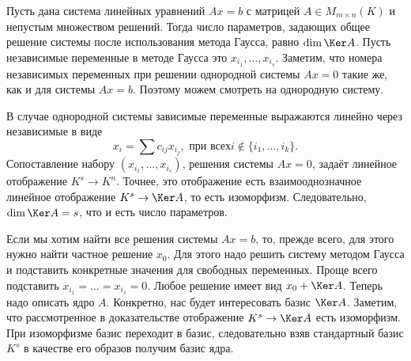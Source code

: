 \thrm Пусть дана система линейных уравнений $Ax=b$ с матрицей $A\in M_{m\times n}(K)$ и непустым множеством решений. Тогда число параметров, задающих общее решение системы после использования метода Гаусса, равно $\dim \Ker A$.
\ethrm
\proof Пусть независимые переменные в методе Гаусса это $x_{i_1}, \dots,x_{i_s}$.
Заметим, что номера независимых переменных при решении однородной системы $Ax=0$ такие же, как и для системы $Ax=b$. Поэтому можем смотреть на однородную систему.

В случае однородной системы зависимые переменные  выражаются линейно через независимые в виде
$$x_i= \sum c_{ij} x_{i_j}, \text{ при всех} i \notin \{i_1,\dots, i_k\}.$$
Сопоставление набору $(x_{i_1},\dots, x_{i_s})$, решения системы $Ax=0$, задаёт линейное отображение $K^s \to K^n$. Точнее, это отображение есть взаимооднозначное линейное отображение $K^s \to \Ker A$, то есть изоморфизм. Следовательно, $\dim \Ker A = s$, что и есть число параметров.
\endproof




Если мы хотим найти все решения системы $Ax=b$, то, прежде всего, для этого нужно найти частное решение $x_0$. Для этого надо решить систему методом Гаусса и подставить конкретные значения для свободных переменных. Проще всего подставить $x_{i_1}=\dots=x_{i_s}=0$. Любое решение имеет вид $x_0+\Ker A$.
Теперь надо описать ядро $A$. Конкретно, нас будет интересовать  базис $\Ker A$. Заметим, что рассмотренное в доказательстве отображение $K^s \to \Ker A$ есть изоморфизм. При изоморфизме базис переходит в базис, следовательно взяв стандартный базис $K^s$ в качестве его образов получим базис ядра.

